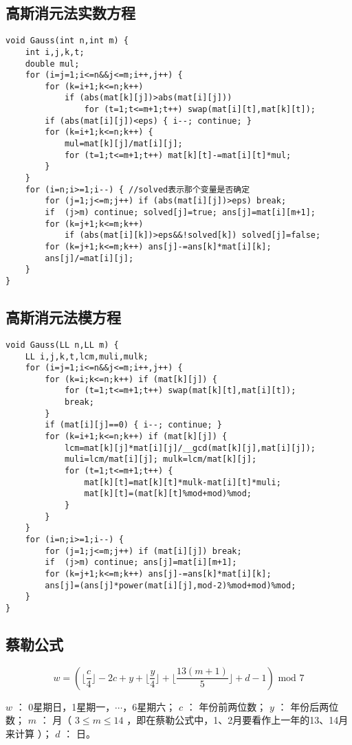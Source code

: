 \documentclass{article}
\begin{document}
\subsection{高斯消元法实数方程}
\begin{lstlisting}
void Gauss(int n,int m) {
	int i,j,k,t;
	double mul;
	for (i=j=1;i<=n&&j<=m;i++,j++) {
		for (k=i+1;k<=n;k++)
			if (abs(mat[k][j])>abs(mat[i][j]))
				for (t=1;t<=m+1;t++) swap(mat[i][t],mat[k][t]);
		if (abs(mat[i][j])<eps) { i--; continue; }
		for (k=i+1;k<=n;k++) {
			mul=mat[k][j]/mat[i][j];
			for (t=1;t<=m+1;t++) mat[k][t]-=mat[i][t]*mul;
		}
	}
	for (i=n;i>=1;i--) { //solved表示那个变量是否确定
		for (j=1;j<=m;j++) if (abs(mat[i][j])>eps) break;
		if  (j>m) continue; solved[j]=true; ans[j]=mat[i][m+1];
		for (k=j+1;k<=m;k++)
			if (abs(mat[i][k])>eps&&!solved[k]) solved[j]=false;
		for (k=j+1;k<=m;k++) ans[j]-=ans[k]*mat[i][k];
		ans[j]/=mat[i][j];
	}
}
\end{lstlisting}
\subsection{高斯消元法模方程}
\begin{lstlisting}
void Gauss(LL n,LL m) {
	LL i,j,k,t,lcm,muli,mulk;
	for (i=j=1;i<=n&&j<=m;i++,j++) {
		for (k=i;k<=n;k++) if (mat[k][j]) {
			for (t=1;t<=m+1;t++) swap(mat[k][t],mat[i][t]);
			break;
		}
		if (mat[i][j]==0) { i--; continue; }
		for (k=i+1;k<=n;k++) if (mat[k][j]) {
			lcm=mat[k][j]*mat[i][j]/__gcd(mat[k][j],mat[i][j]);
			muli=lcm/mat[i][j]; mulk=lcm/mat[k][j];
			for (t=1;t<=m+1;t++) {
				mat[k][t]=mat[k][t]*mulk-mat[i][t]*muli;
				mat[k][t]=(mat[k][t]%mod+mod)%mod;
			}
		}
	}
	for (i=n;i>=1;i--) {
		for (j=1;j<=m;j++) if (mat[i][j]) break;
		if  (j>m) continue; ans[j]=mat[i][m+1];
		for (k=j+1;k<=m;k++) ans[j]-=ans[k]*mat[i][k];
		ans[j]=(ans[j]*power(mat[i][j],mod-2)%mod+mod)%mod;
	}
}
\end{lstlisting}

\subsection{蔡勒公式}

$$w = (\lfloor \frac{c}{4} \rfloor - 2c + y + \lfloor \frac{y}{4} \rfloor + \lfloor \frac{13(m+1)}{5} \rfloor + d - 1) \text{ mod } 7$$

 $w$ ： 0星期日，1星期一，$\cdots$，6星期六；
 $c$ ： 年份前两位数；
 $y$ ： 年份后两位数；
 $m$ ： 月（ $3 \leq m \leq 14$ ，即在蔡勒公式中，1、2月要看作上一年的13、14月来计算 ）；
 $d$ ： 日。
\end{document}
